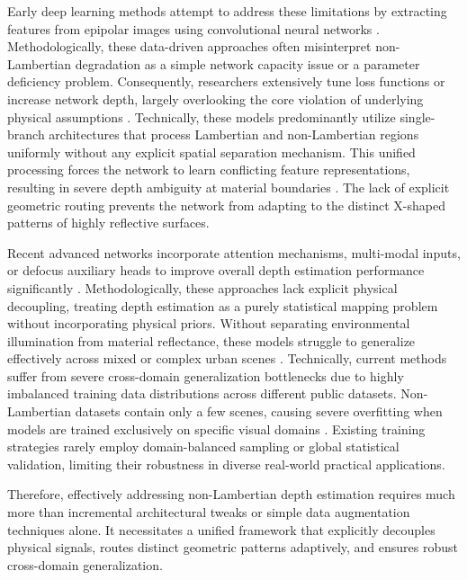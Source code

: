 \documentclass[lettersize,journal]{IEEEtran}
\begin{document}
Early deep learning methods attempt to address these limitations by extracting features from epipolar images using convolutional neural networks \cite{early_dl_lf, cnn_epi}. Methodologically, these data-driven approaches often misinterpret non-Lambertian degradation as a simple network capacity issue or a parameter deficiency problem. Consequently, researchers extensively tune loss functions or increase network depth, largely overlooking the core violation of underlying physical assumptions \cite{loss_function_tuning, physical_assumptions}. Technically, these models predominantly utilize single-branch architectures that process Lambertian and non-Lambertian regions uniformly without any explicit spatial separation mechanism. This unified processing forces the network to learn conflicting feature representations, resulting in severe depth ambiguity at material boundaries \cite{single_branch_architecture, depth_ambiguity}. The lack of explicit geometric routing prevents the network from adapting to the distinct X-shaped patterns of highly reflective surfaces.

Recent advanced networks incorporate attention mechanisms, multi-modal inputs, or defocus auxiliary heads to improve overall depth estimation performance significantly \cite{attention_lf, defocus_lf}. Methodologically, these approaches lack explicit physical decoupling, treating depth estimation as a purely statistical mapping problem without incorporating physical priors. Without separating environmental illumination from material reflectance, these models struggle to generalize effectively across mixed or complex urban scenes \cite{mixed_scenes, generalization}. Technically, current methods suffer from severe cross-domain generalization bottlenecks due to highly imbalanced training data distributions across different public datasets. Non-Lambertian datasets contain only a few scenes, causing severe overfitting when models are trained exclusively on specific visual domains \cite{data_imbalance, overfitting}. Existing training strategies rarely employ domain-balanced sampling or global statistical validation, limiting their robustness in diverse real-world practical applications.

Therefore, effectively addressing non-Lambertian depth estimation requires much more than incremental architectural tweaks or simple data augmentation techniques alone. It necessitates a unified framework that explicitly decouples physical signals, routes distinct geometric patterns adaptively, and ensures robust cross-domain generalization.
\end{document}
